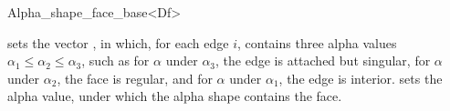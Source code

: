 \begin{ccRefClass}{Alpha_shape_face_base<Df>}
\ccModifiers

\begin{ccAdvanced}

{sets the vector , in which, for each edge $i$,  contains three
alpha values
 $\alpha_1 \leq \alpha_2 \leq \alpha_3$, such as for
$\alpha$ under $\alpha_3$, the edge is attached but singular,
for $\alpha$ under $\alpha_2$, the face is regular, and for $\alpha$
under $\alpha_1$, the edge is interior.}
{sets the alpha value, under which the alpha shape contains the
face.}

\end{ccAdvanced}

\end{ccRefClass}
